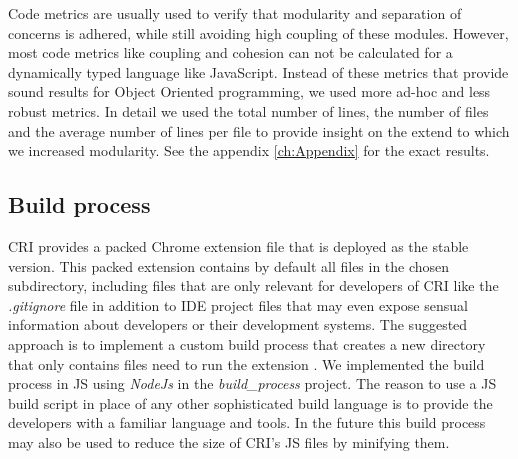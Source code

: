 Code metrics are usually used to verify that modularity and separation of concerns is adhered, while still avoiding high coupling of these modules. However, most code metrics like coupling and cohesion \cite{Coupling} can not be calculated for a dynamically typed language like JavaScript. Instead of these metrics that provide sound results for Object Oriented programming, we used more ad-hoc and less robust metrics. In detail we used the total number of lines, the number of files and the average number of lines per file to provide insight on the extend to which we increased modularity. See the appendix \ref{ch:Appendix} for the exact results.
	
\subsection{Build process}
CRI provides a packed Chrome extension file that is deployed as the stable version. This packed extension contains by default all files in the chosen subdirectory, including files that are only relevant for developers of CRI like the \emph{.gitignore} file in addition to IDE project files that may even expose sensual information about developers or their development systems. The suggested approach is to implement a custom build process that creates a new directory that only contains files need to run the extension \cite{BuildScript}. We implemented the build process in JS using \emph{NodeJs} in the \emph{build\_process} project. The reason to use a JS build script in place of any other sophisticated build language is to provide the developers with a familiar language and tools. In the future this build process may also be used to reduce the size of CRI's JS files by minifying them. 